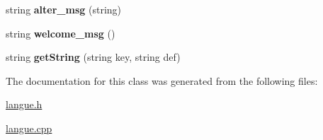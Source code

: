 \begin{DoxyCompactItemize}
\item 
\hypertarget{classLangue_a69d3146a8e1165182f18da68cafe6ed9}{string {\bfseries alter\-\_\-msg} (string)}\label{classLangue_a69d3146a8e1165182f18da68cafe6ed9}

\item 
\hypertarget{classLangue_adf001d38be5e01488884f7ca6f6db938}{string {\bfseries welcome\-\_\-msg} ()}\label{classLangue_adf001d38be5e01488884f7ca6f6db938}

\item 
\hypertarget{classLangue_a7332c2807e4eda655922408c973d40ba}{string {\bfseries get\-String} (string key, string def)}\label{classLangue_a7332c2807e4eda655922408c973d40ba}

\end{DoxyCompactItemize}


The documentation for this class was generated from the following files\-:\begin{DoxyCompactItemize}
\item 
\hyperlink{langue_8h}{langue.\-h}\item 
\hyperlink{langue_8cpp}{langue.\-cpp}\end{DoxyCompactItemize}
